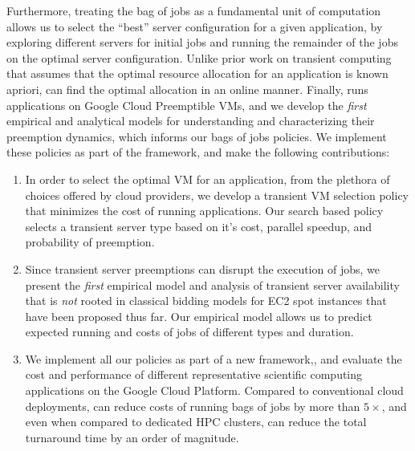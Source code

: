 %
Furthermore, treating the bag of jobs as a fundamental unit of computation allows us to select the ``best'' server configuration for a given application, by exploring different servers for initial jobs and running the remainder of the jobs on the optimal server configuration. 
Unlike prior work on transient computing that assumes that the optimal resource allocation for an application is known apriori, \sysname can find the optimal allocation in an online manner. 
Finally, \sysname runs applications on Google Cloud Preemptible VMs, and we develop the \emph{first} empirical and analytical models for understanding and characterizing their preemption dynamics, which informs our bags of jobs policies. 
We implement these policies as part of the \sysname framework, and make the following contributions:
\begin{enumerate}[leftmargin=12pt]
\item In order to select the optimal VM for an application, from the plethora of choices offered by cloud providers, we develop a transient VM selection policy that minimizes the cost of running applications. Our search based policy selects a transient server type based on it's cost, parallel speedup, and probability of preemption. 

  
\item Since transient server preemptions can disrupt the execution of jobs, we present the \emph{first} empirical model and analysis of transient server availability that is \emph{not} rooted in classical bidding models for EC2 spot instances that have been proposed thus far. Our empirical model allows us to predict expected running and costs of jobs of different types and duration.

  
\item We implement all our policies as part of a new framework,\sysname, and evaluate the cost and performance of different representative scientific computing  applications on the Google Cloud Platform. Compared to conventional cloud deployments, \sysname can reduce costs of running bags of jobs by more than $5\times$, and even when compared to dedicated HPC clusters, can reduce the total turnaround time by an order of magnitude. 

\end{enumerate}

